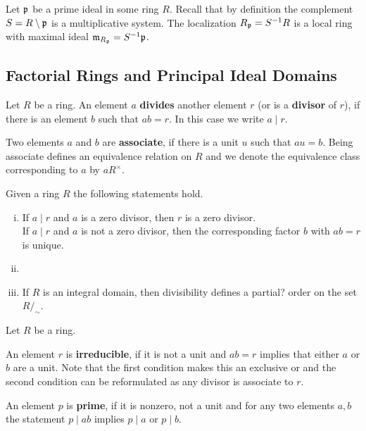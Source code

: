 	\begin{corollary}
		Let $\mathfrak{p}$ be a prime ideal in some ring $R$. Recall that by definition the complement $S = R\setminus \mathfrak{p}$ is a multiplicative system. The localization $R_{\mathfrak{p}} = S^{-1}R$ is a local ring with maximal ideal $\mathfrak{m}_{R_{\mathfrak{p}}} = S^{-1}\mathfrak{p}$.
	\end{corollary}

	\newpage
	\subsection{Factorial Rings and Principal Ideal Domains}

	\begin{definition}
		Let $R$ be a ring. An element $a$ \textbf{divides} another element $r$ (or is a \textbf{divisor} of $r$), if there is an element $b$ such that $ab = r$. In this case we write $a \mid r$.

		Two elements $a$ and $b$ are \textbf{associate}, if there is a unit $u$ such that $au = b$. Being associate defines an equivalence relation on $R$ and we denote the equivalence class corresponding to $a$ by $aR^\times$. 
	\end{definition}

	\begin{lemma}
		Given a ring $R$ the following statements hold.
		\begin{enumerate}[(i)]
			\item{
				If $a \mid r$ and $a$ is a zero divisor, then $r$ is a zero divisor.\\
				If $a \mid r$ and $a$ is not a zero divisor, then the corresponding factor $b$ with $ab = r$ is unique.
			}
			\item{
			}
			\item{
				If $R$ is an integral domain, then divisibility defines a partial? order on the set $R/_\sim$.
			}
		\end{enumerate}
	\end{lemma}

	\begin{definition}
		Let $R$ be a ring. 

		An element $r$ is \textbf{irreducible}, if it is not a unit and $ab = r$ implies that either $a$ or $b$ are a unit. Note that the first condition makes this an exclusive or and the second condition can be reformulated as any divisor is associate to $r$.

		An element $p$ is \textbf{prime}, if it is nonzero, not a unit and for any two elements $a,b$ the statement $p \mid ab$ implies $p \mid a$ or $p \mid b$.
	\end{definition}


